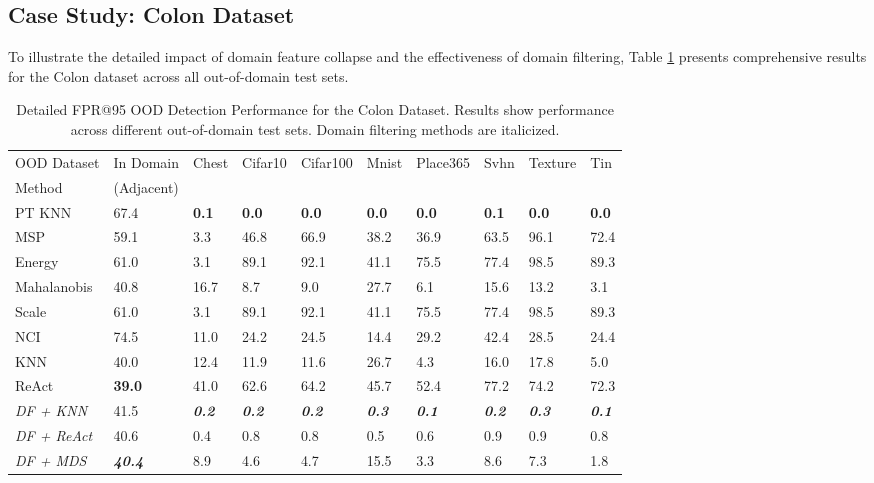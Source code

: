 \documentclass[11pt, oneside]{book}
\theoremstyle{plain}
\theoremstyle{definition}
\theoremstyle{remark}
\begin{document}
\subsection{Case Study: Colon Dataset}

To illustrate the detailed impact of domain feature collapse and the effectiveness of domain filtering, Table \ref{tab:colon_detailed} presents comprehensive results for the Colon dataset across all out-of-domain test sets.

\begin{table}[h]
\centering
\caption{Detailed FPR@95 OOD Detection Performance for the Colon Dataset. Results show performance across different out-of-domain test sets. Domain filtering methods are italicized.}
\label{tab:colon_detailed}
\begin{tabular}{llllllllll}
\toprule
OOD Dataset & In Domain  & Chest & Cifar10 & Cifar100 & Mnist & Place365 & Svhn & Texture & Tin \\
Method &  (Adjacent) &  &  &  &  &  &  &  &  \\
\midrule
PT KNN & 67.4 & \textbf{0.1} & \textbf{0.0} & \textbf{0.0} & \textbf{0.0} & \textbf{0.0} & \textbf{0.1} & \textbf{0.0} & \textbf{0.0} \\
MSP & 59.1 & 3.3 & 46.8 & 66.9 & 38.2 & 36.9 & 63.5 & 96.1 & 72.4 \\
Energy & 61.0 & 3.1 & 89.1 & 92.1 & 41.1 & 75.5 & 77.4 & 98.5 & 89.3 \\
Mahalanobis & 40.8 & 16.7 & 8.7 & 9.0 & 27.7 & 6.1 & 15.6 & 13.2 & 3.1 \\
Scale & 61.0 & 3.1 & 89.1 & 92.1 & 41.1 & 75.5 & 77.4 & 98.5 & 89.3 \\
NCI & 74.5 & 11.0 & 24.2 & 24.5 & 14.4 & 29.2 & 42.4 & 28.5 & 24.4 \\
KNN & 40.0 & 12.4 & 11.9 & 11.6 & 26.7 & 4.3 & 16.0 & 17.8 & 5.0 \\
ReAct & \textbf{39.0} & 41.0 & 62.6 & 64.2 & 45.7 & 52.4 & 77.2 & 74.2 & 72.3 \\
\textit{DF + KNN} & 41.5 & \textbf{\textit{0.2}} & \textbf{\textit{0.2}} & \textbf{\textit{0.2}} & \textbf{\textit{0.3}} & \textbf{\textit{0.1}} & \textbf{\textit{0.2}} & \textbf{\textit{0.3}} & \textbf{\textit{0.1}} \\
\textit{DF + ReAct} & 40.6 & 0.4 & 0.8 & 0.8 & 0.5 & 0.6 & 0.9 & 0.9 & 0.8 \\
\textit{DF + MDS} & \textbf{\textit{40.4}} & 8.9 & 4.6 & 4.7 & 15.5 & 3.3 & 8.6 & 7.3 & 1.8 \\
\bottomrule
\end{tabular}
\end{table}
\end{document}
